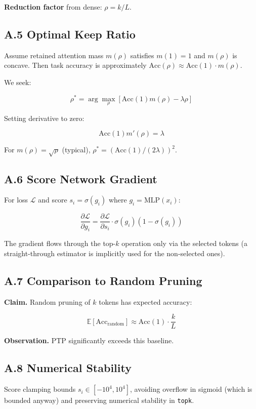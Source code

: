 {\textbf{Reduction factor} from dense: $\rho = k / L$.

\subsection{A.5 Optimal Keep Ratio}

Assume retained attention mass $m(\rho)$ satisfies $m(1) = 1$ and 
$m(\rho)$ is concave. Then task accuracy is approximately 
$\text{Acc}(\rho) \approx \text{Acc}(1) \cdot m(\rho)$.

We seek:

\[
\rho^* = \arg\max_\rho \left[\text{Acc}(1) m(\rho) - \lambda \rho\right]
\tag{A.2}
\]

Setting derivative to zero:

\[
\text{Acc}(1) m'(\rho) = \lambda
\tag{A.3}
\]

For $m(\rho) = \sqrt{\rho}$ (typical), $\rho^* = (\text{Acc}(1) / (2\lambda))^2$.

\subsection{A.6 Score Network Gradient}

For loss $\mathcal{L}$ and score $s_i = \sigma(g_i)$ where 
$g_i = \text{MLP}(x_i)$:

\[
\frac{\partial \mathcal{L}}{\partial g_i} = \frac{\partial \mathcal{L}}{\partial s_i} \cdot \sigma(g_i)(1 - \sigma(g_i))
\tag{A.4}
\]

The gradient flows through the top-$k$ operation only via the selected 
tokens (a straight-through estimator is implicitly used for the 
non-selected ones).

\subsection{A.7 Comparison to Random Pruning}

\textbf{Claim.} Random pruning of $k$ tokens has expected accuracy:

\[
\mathbb{E}[\text{Acc}_\text{random}] \approx \text{Acc}(1) \cdot \frac{k}{L}
\tag{A.5}
\]

\textbf{Observation.} PTP significantly exceeds this baseline.

\subsection{A.8 Numerical Stability}

Score clamping bounds $s_i \in [-10^4, 10^4]$, avoiding overflow in 
sigmoid (which is bounded anyway) and preserving numerical stability 
in \texttt{topk}.




}
